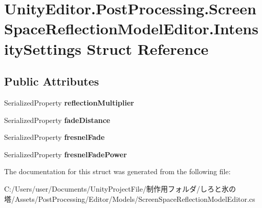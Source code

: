 \hypertarget{struct_unity_editor_1_1_post_processing_1_1_screen_space_reflection_model_editor_1_1_intensity_settings}{}\section{Unity\+Editor.\+Post\+Processing.\+Screen\+Space\+Reflection\+Model\+Editor.\+Intensity\+Settings Struct Reference}
\label{struct_unity_editor_1_1_post_processing_1_1_screen_space_reflection_model_editor_1_1_intensity_settings}
\subsection*{Public Attributes}
\begin{DoxyCompactItemize}
\item 
\mbox{\label{struct_unity_editor_1_1_post_processing_1_1_screen_space_reflection_model_editor_1_1_intensity_settings_a49ff4ccba3bc9a4005ffb8a02e401739}} 
Serialized\+Property {\bfseries reflection\+Multiplier}
\item 
\mbox{\label{struct_unity_editor_1_1_post_processing_1_1_screen_space_reflection_model_editor_1_1_intensity_settings_acf78a628adfa293c068918f54b95e6ba}} 
Serialized\+Property {\bfseries fade\+Distance}
\item 
\mbox{\label{struct_unity_editor_1_1_post_processing_1_1_screen_space_reflection_model_editor_1_1_intensity_settings_ab6a701b654ccd0c5bcb9328bddc5ec46}} 
Serialized\+Property {\bfseries fresnel\+Fade}
\item 
\mbox{\label{struct_unity_editor_1_1_post_processing_1_1_screen_space_reflection_model_editor_1_1_intensity_settings_ab63d915d1f8fd3dc98229c4a367deddf}} 
Serialized\+Property {\bfseries fresnel\+Fade\+Power}
\end{DoxyCompactItemize}


The documentation for this struct was generated from the following file\+:\begin{DoxyCompactItemize}
\item 
C\+:/\+Users/user/\+Documents/\+Unity\+Project\+File/制作用フォルダ/しろと氷の塔/\+Assets/\+Post\+Processing/\+Editor/\+Models/Screen\+Space\+Reflection\+Model\+Editor.\+cs\end{DoxyCompactItemize}
